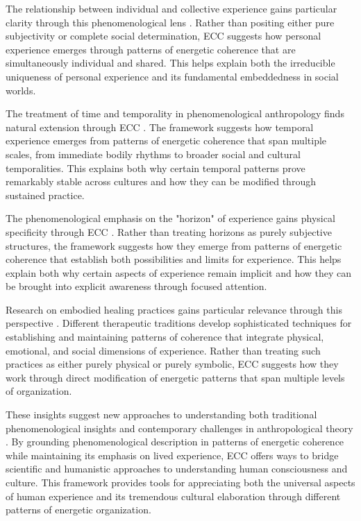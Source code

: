 The relationship between individual and collective experience gains particular clarity through this phenomenological lens \cite{thompson2007mind}. Rather than positing either pure subjectivity or complete social determination, ECC suggests how personal experience emerges through patterns of energetic coherence that are simultaneously individual and shared. This helps explain both the irreducible uniqueness of personal experience and its fundamental embeddedness in social worlds.

The treatment of time and temporality in phenomenological anthropology finds natural extension through ECC \cite{throop2003articulating}. The framework suggests how temporal experience emerges from patterns of energetic coherence that span multiple scales, from immediate bodily rhythms to broader social and cultural temporalities. This explains both why certain temporal patterns prove remarkably stable across cultures and how they can be modified through sustained practice.

The phenomenological emphasis on the "horizon" of experience gains physical specificity through ECC \cite{zahavi2003husserl}. Rather than treating horizons as purely subjective structures, the framework suggests how they emerge from patterns of energetic coherence that establish both possibilities and limits for experience. This helps explain both why certain aspects of experience remain implicit and how they can be brought into explicit awareness through focused attention.

Research on embodied healing practices gains particular relevance through this perspective \cite{csordas1993somatic}. Different therapeutic traditions develop sophisticated techniques for establishing and maintaining patterns of coherence that integrate physical, emotional, and social dimensions of experience. Rather than treating such practices as either purely physical or purely symbolic, ECC suggests how they work through direct modification of energetic patterns that span multiple levels of organization.

These insights suggest new approaches to understanding both traditional phenomenological insights and contemporary challenges in anthropological theory \cite{serres1995natural}. By grounding phenomenological description in patterns of energetic coherence while maintaining its emphasis on lived experience, ECC offers ways to bridge scientific and humanistic approaches to understanding human consciousness and culture. This framework provides tools for appreciating both the universal aspects of human experience and its tremendous cultural elaboration through different patterns of energetic organization.